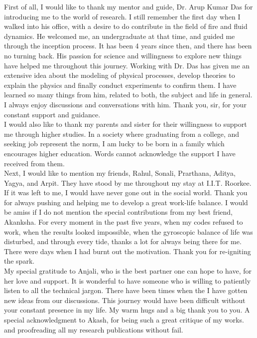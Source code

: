 \begin{acknowledgements}
First of all, I would like to thank my mentor and guide, Dr. Arup Kumar Das for introducing me to the world of research. I still remember the first day when I walked into his office, with a desire to do contribute in the field of fire and fluid dynamics. He welcomed me, an undergraduate at that time, and guided me through the inception process. It has been 4 years since then, and there has been no turning back. His passion for science and willingness to explore new things have helped me throughout this journey. Working with Dr. Das has given me an extensive idea about the modeling of physical processes, develop theories to explain the physics and finally conduct experiments to confirm them. I have learned so many things from him, related to both, the subject and life in general. I always enjoy discussions and conversations with him. Thank you, sir, for your constant support and guidance.\\
I would also like to thank my parents and sister for their willingness to support me through higher studies. In a society where graduating from a college, and seeking job represent the norm, I am lucky to be born in a family which encourages higher education. Words cannot acknowledge the support I have received from them.\\
Next, I would like to mention my friends, Rahul, Sonali, Prarthana, Aditya, Yagya, and Arpit. They have stood by me throughout my stay at I.I.T. Roorkee. If it was left to me, I would have never gone out in the social world. Thank you for always pushing and helping me to develop a great work-life balance. I would be amiss if I do not mention the special contributions from my best friend, Akanksha. For every moment in the past five years, when my codes refused to work, when the results looked impossible, when the gyroscopic balance of life was disturbed, and through every tide, thanks a lot for always being there for me. There were days when I had burnt out the motivation. Thank you for re-igniting the spark.\\
My special gratitude to Anjali, who is the best partner one can hope to have, for her love and support. It is wonderful to have someone who is willing to patiently listen to all the technical jargon. There have been times when the I have gotten new ideas from our discussions. This journey would have been difficult without your constant presence in my life. My warm hugs and a big thank you to you. A special acknowledgment to Akash, for being such a great critique of my works. and proofreading all my research publications without fail.\\

\end{acknowledgements}

